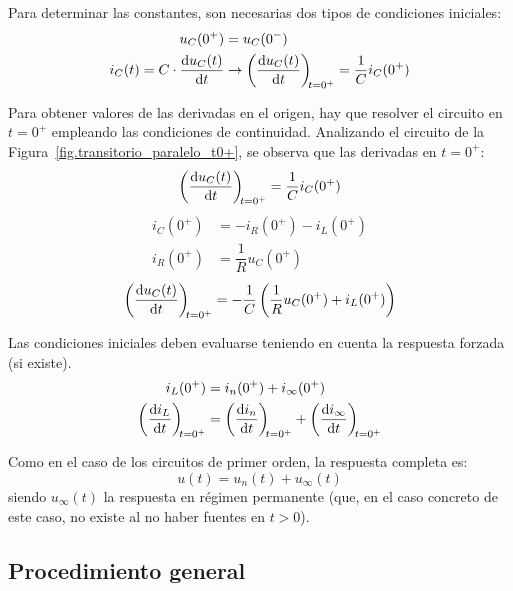 	Para determinar las constantes, son necesarias dos tipos de condiciones iniciales:
\begin{align*}
  u_C(0^+) &= u_C(0^-)\\
  i_C(t) = C \cdot \diff{u_C(t)}{t}& \rightarrow   \diff{u_C(t)}{t}[t = 0^+] = \frac{1}{C} i_C(0^+)
\end{align*}

Para obtener valores de las derivadas en el origen, hay que resolver el circuito en \(t = 0^+\) empleando las condiciones de continuidad. Analizando el circuito de la Figura~\ref{fig.transitorio_paralelo_t0+}, se observa que las derivadas en $t=0^+$:
\[
  \diff{u_C(t)}{t}[t = 0^+] = \frac{1}{C} i_C(0^+)
\]
\begin{align*}
  i_C(0^+) &= -i_R(0^+) - i_L(0^+)\\
  i_R(0^+) &= \dfrac{1}{R} u_C(0^+)
\end{align*}
\[
{\diff{u_C(t)}{t}[t = 0^+] = - \frac{1}{C}\left(\frac{1}{R} u_C(0^+) + i_L(0^+)\right)}
\]
\begin{remark}
Las condiciones iniciales deben evaluarse teniendo en cuenta la respuesta forzada (si existe).
\begin{align*}
  i_L(0^+) &= i_n(0^+) + i_{\infty}(0^+)\\
  \diff{i_L}{t}[t = 0^+] &= \diff{i_n}{t}[t = 0^+] + \diff{i_{\infty}}{t}[t = 0^+]  
\end{align*}
\end{remark}
Como en el caso de los circuitos de primer orden, la respuesta completa es: 
\begin{equation*}
    u(t)=u_n(t)+u_\infty(t)
\end{equation*}
siendo $u_\infty(t)$ la respuesta en régimen permanente (que, en el caso concreto de este caso, no existe al no haber fuentes en $t>0$).
	
	\subsection{Procedimiento general}
	
